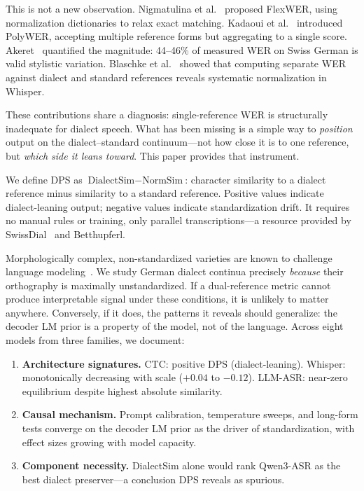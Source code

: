 \documentclass[11pt,a4paper]{article}
\begin{document}
This is not a new observation. Nigmatulina et al.~ proposed FlexWER, using normalization dictionaries to relax exact matching. Kadaoui et al.~ introduced PolyWER, accepting multiple reference forms but aggregating to a single score. Akeret~ quantified the magnitude: 44--46\% of measured WER on Swiss German is valid stylistic variation. Blaschke et al.~ showed that computing separate WER against dialect and standard references reveals systematic normalization in Whisper.

These contributions share a diagnosis: single-reference WER is structurally inadequate for dialect speech. What has been missing is a simple way to \textit{position} output on the dialect--standard continuum---not how close it is to one reference, but \textit{which side it leans toward}. This paper provides that instrument.

We define DPS as $\text{DialectSim} - \text{NormSim}$: character similarity to a dialect reference minus similarity to a standard reference. Positive values indicate dialect-leaning output; negative values indicate standardization drift. It requires no manual rules or training, only parallel transcriptions---a resource provided by SwissDial~ and Betthupferl.~

Morphologically complex, non-standardized varieties are known to challenge language modeling~. We study German dialect continua precisely \textit{because} their orthography is maximally unstandardized. If a dual-reference metric cannot produce interpretable signal under these conditions, it is unlikely to matter anywhere. Conversely, if it does, the patterns it reveals should generalize: the decoder LM prior is a property of the model, not of the language. Across eight models from three families, we document:

\begin{enumerate}
\item \textbf{Architecture signatures.} CTC: positive DPS (dialect-leaning). Whisper: monotonically decreasing with scale ($+0.04$ to $-0.12$). LLM-ASR: near-zero equilibrium despite highest absolute similarity.
\item \textbf{Causal mechanism.} Prompt calibration, temperature sweeps, and long-form tests converge on the decoder LM prior as the driver of standardization, with effect sizes growing with model capacity.
\item \textbf{Component necessity.} DialectSim alone would rank Qwen3-ASR as the best dialect preserver---a conclusion DPS reveals as spurious.
\end{enumerate}
\end{document}
